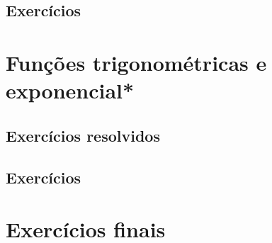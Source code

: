 \construirExeresol


\subsection*{Exercícios}

\construirExer


\section{Funções trigonométricas e exponencial*}
\construirSec

\subsection*{Exercícios resolvidos}

\construirExeresol

\subsection*{Exercícios}

\construirExer

\section{Exercícios finais}

\construirExer



